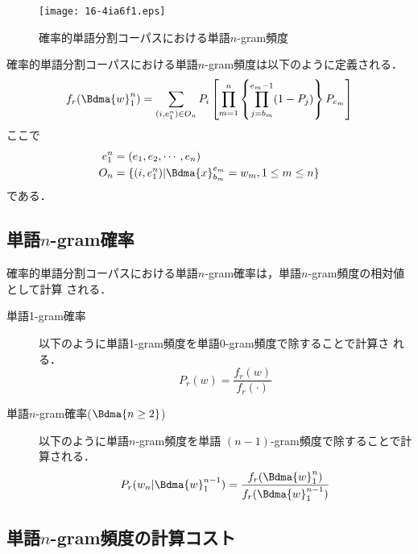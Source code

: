 \documentclass[japanese]{jnlp_1.4}
\begin{document}
\begin{description}
\begin{figure}[t]
  \begin{center}
\texttt{[image: 16-4ia6f1.eps]}
  \end{center}
  \caption{確率的単語分割コーパスにおける単語$n$-gram頻度}
  \label{figure:SSC}
\end{figure}


  確率的単語分割コーパスにおける単語$n$-gram頻度は以下のように定義される．
  \begin{equation}
    \label{eqnarray:n-gram}
    f_{r}(\Bdma{w}_{1}^{n})
    = 
    \sum_{(i,e_{1}^{n}) \in O_{n}} P_{i} \left[
    \prod_{m=1}^{n} \left\{
    \prod_{j=b_{m}}^{e_{m}-1} (1-P_{j}) \right\}
    P_{e_{m}} \right]
  \end{equation}
  ここで
  \begin{align*}
    e_{1}^{n}
    & =  (e_{1},e_{2},\cdots,e_{n}) \\
    O_{n}     
    & =  \{(i,e_{1}^{n}) | \Bdma{x}_{b_{m}}^{e_{m}} = w_{m}, 1 \leq m \leq n \}
  \end{align*}
  である．
\end{description}




\subsection{単語$n$-gram確率}

確率的単語分割コーパスにおける単語$n$-gram確率は，単語$n$-gram頻度の相対値として計算
される．

\begin{description}
\item[単語1-gram確率] 以下のように単語1-gram頻度を単語0-gram頻度で除することで計算さ
  れる．
  \begin{equation}
    \label{equation:1-gram}
    P_r(w) = \frac{f_r(w)}{f_r(\cdot)}
  \end{equation}
\item[単語$n$-gram確率($\Bdma{n\geq2}$)] 以下のように単語$n$-gram頻度を単語
  $(n-1)$-gram頻度で除することで計算される．
  \begin{equation}
    \label{equation:n-gram}
    P_r(w_{n}|\Bdma{w}_{1}^{n-1})
    = \frac{f_r(\Bdma{w}_{1}^{n})}{f_r(\Bdma{w}_{1}^{n-1})}
  \end{equation}
\end{description}



\subsection{単語$n$-gram頻度の計算コスト}
\end{document}

